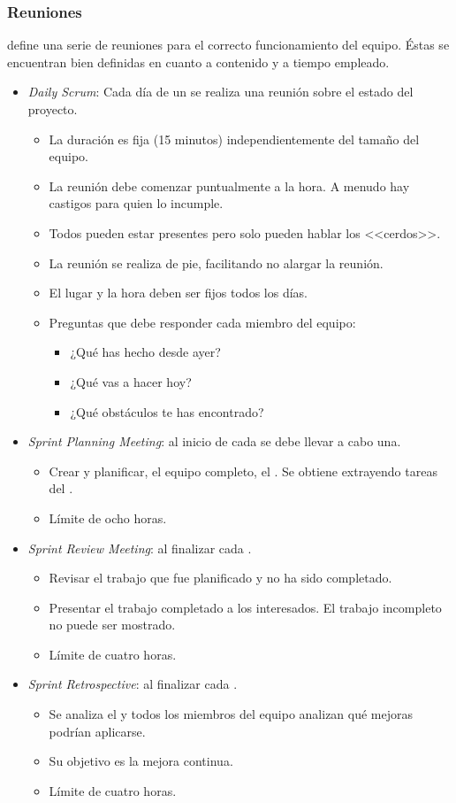 \subsubsection*{Reuniones}
\scrum{} define una serie de reuniones para el correcto funcionamiento del equipo. Éstas se encuentran bien definidas en cuanto a contenido y a tiempo empleado.
\begin{itemize}
 \item \textit{Daily Scrum}: Cada día de un \sprint{} se realiza una reunión sobre el estado del proyecto.
  \begin{itemize}
   \item La duración es fija (15 minutos) independientemente del tamaño del equipo.
   \item La reunión debe comenzar puntualmente a la hora. A menudo hay castigos para quien lo incumple.
   \item Todos pueden estar presentes pero solo pueden hablar los <<cerdos>>.
   \item La reunión se realiza de pie, facilitando no alargar la reunión.
   \item El lugar y la hora deben ser fijos todos los días.
   \item Preguntas que debe responder cada miembro del equipo:
    \begin{itemize}
     \item ¿Qué has hecho desde ayer?
     \item ¿Qué vas a hacer hoy?
     \item ¿Qué obstáculos te has encontrado?
    \end{itemize}
  \end{itemize}
 \item \textit{Sprint Planning Meeting}: al inicio de cada \sprint{} se debe llevar a cabo una.
  \begin{itemize}
   \item Crear y planificar, el equipo completo, el \sprintbacklog{}. Se obtiene extrayendo tareas del \productbacklog{}.
   \item Límite de ocho horas.
  \end{itemize}
 \item \textit{Sprint Review Meeting}: al finalizar cada \sprint{}.
  \begin{itemize}
   \item Revisar el trabajo que fue planificado y no ha sido completado.
   \item Presentar el trabajo completado a los interesados. El trabajo incompleto no puede ser mostrado.
   \item Límite de cuatro horas.
  \end{itemize}
 \item \textit{Sprint Retrospective}: al finalizar cada \sprint{}.
  \begin{itemize}
   \item Se analiza el \sprint{} y todos los miembros del equipo analizan qué mejoras podrían aplicarse.
   \item Su objetivo es la mejora continua.
   \item Límite de cuatro horas.
  \end{itemize}
\end{itemize}


